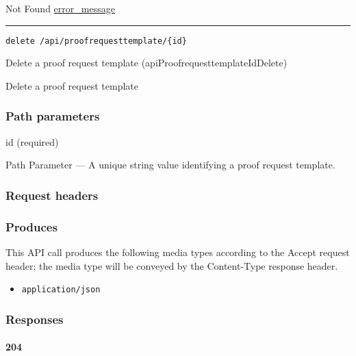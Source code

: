 Not Found \protect\hyperlink{error_message}{error\_message}

\begin{center}\rule{0.5\linewidth}{\linethickness}\end{center}

\protect\hypertarget{apiProofrequesttemplateIdDelete}{}{}

\begin{verbatim}
delete /api/proofrequesttemplate/{id}
\end{verbatim}

Delete a proof request template ({apiProofrequesttemplateIdDelete})

Delete a proof request template

\hypertarget{path-parameters-93}{%
\subsubsection{Path parameters}\label{path-parameters-93}}

id (required)

{Path Parameter} --- A unique string value identifying a proof request
template.

\hypertarget{request-headers-95}{%
\subsubsection{Request headers}\label{request-headers-95}}

\hypertarget{produces-169}{%
\subsubsection{Produces}\label{produces-169}}

This API call produces the following media types according to the
{Accept} request header; the media type will be conveyed by the
{Content-Type} response header.

\begin{itemize}
\tightlist
\item
  \texttt{application/json}
\end{itemize}

\hypertarget{responses-174}{%
\subsubsection{Responses}\label{responses-174}}

\hypertarget{section-561}{%
\paragraph{204}\label{section-561}}

